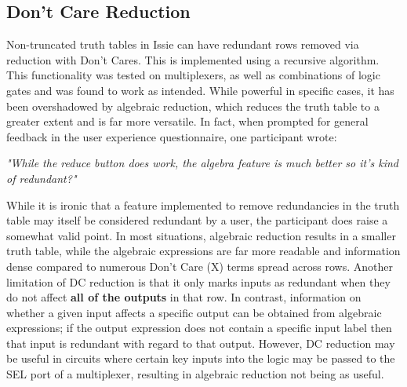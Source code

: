 \subsection{Don't Care Reduction}
Non-truncated truth tables in Issie can have redundant rows removed via reduction with Don't Cares. This is implemented using a recursive algorithm. This functionality was tested on multiplexers, as well as combinations of logic gates and was found to work as intended. While powerful in specific cases, it has been overshadowed by algebraic reduction, which reduces the truth table to a greater extent and is far more versatile. In fact, when prompted for general feedback in the user experience questionnaire, one participant wrote:
\begin{center}
    \textit{"While the reduce button does work, the algebra feature is much better so it's kind of redundant?"}
\end{center}
While it is ironic that a feature implemented to remove redundancies in the truth table may itself be considered redundant by a user, the participant does raise a somewhat valid point. In most situations, algebraic reduction results in a smaller truth table, while the algebraic expressions are far more readable and information dense compared to numerous Don't Care (X) terms spread across rows. Another limitation of DC reduction is that it only marks inputs as redundant when they do not affect \textbf{all of the outputs} in that row. In contrast,  information on whether a given input affects a specific output can be obtained from algebraic expressions; if the output expression does not contain a specific input label then that input is redundant with regard to that output. However, DC reduction may be useful in circuits where certain key inputs into the logic may be passed to the SEL port of a multiplexer, resulting in algebraic reduction not being as useful. 

